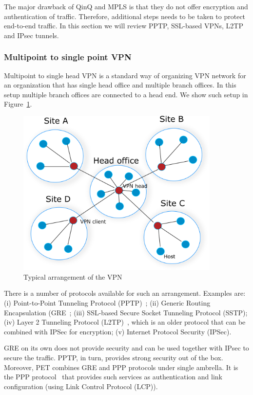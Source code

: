 The major drawback of QinQ and MPLS is that they do not offer encryption and 
authentication of traffic. Therefore, additional steps needs to be taken to protect end-to-end
traffic. In this section we will review PPTP, SSL-based VPNs, L2TP and IPsec tunnels.

\subsubsection{Multipoint to single point VPN}

Multipoint to single head VPN is a standard way of organizing VPN network
for an organization that has single head office and multiple branch offices.
In this setup multiple branch offices are connected to a head end. 
We show such setup in Figure~\ref{fig:head-vpn}.

\begin{figure}[ht!]
    \centering
    \includegraphics[width=0.9\textwidth]{graphics/vpn-central.png}
    \caption{Typical arrangement of the VPN}
    \label{fig:head-vpn}
\end{figure}

There is a number of protocols available for such an arrangement. Examples are:
(i) Point-to-Point Tunneling Protocol (PPTP)~\cite{tcpip}; (ii) Generic Routing Encapsulation (GRE~\cite{tcpip}; 
(iii) SSL-based Secure Socket Tunneling Protocol (SSTP); (iv) Layer 2 Tunneling Protocol (L2TP)~\cite{tcpip}, 
which is an older protocol that can be combined with IPSec for encryption;
(v) Internet Protocol Security (IPSec).

GRE on its own does not provide security and can be used together with IPsec to secure 
the traffic. PPTP, in turn, provides strong security out of the box. Moreover, PET combines 
GRE and PPP protocols under single ambrella. It is the PPP protocol~\cite{tcpip}
that provides such services as authentication and link configuration (\ie using Link Control Protocol (LCP)).

